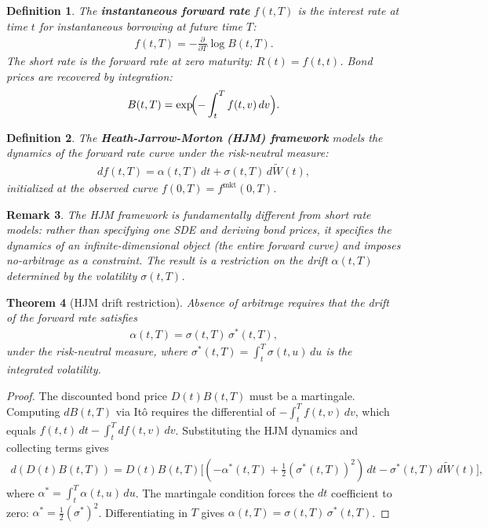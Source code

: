 \documentclass{report}
\theoremstyle{spacedplain}
\newtheorem{theorem}{Theorem}[section]
\theoremstyle{spaceddefinition}
\newtheorem{definition}[theorem]{Definition}
\theoremstyle{spacedremark}
\newtheorem{remark}[theorem]{Remark}
\begin{document}
\begin{definition}
The \textbf{instantaneous forward rate} $f(t,T)$ is the interest rate at time $t$ for instantaneous borrowing at future time $T$:
\begin{align}
    f(t,T) = -\frac{\partial}{\partial T}\log B(t,T).
\end{align}
The short rate is the forward rate at zero maturity: $R(t) = f(t,t)$. Bond prices are recovered by integration:
\begin{align}
    B(t,T) = \exp\!\Bigl(-\int_t^T f(t,v)\,dv\Bigr).
\end{align}
\end{definition}

\begin{definition}
The \textbf{Heath-Jarrow-Morton (HJM) framework} models the dynamics of the forward rate curve under the risk-neutral measure:
\begin{align}
    df(t,T) = \alpha(t,T)\,dt + \sigma(t,T)\,d\widetilde{W}(t),
\end{align}
initialized at the observed curve $f(0,T) = f^{\text{mkt}}(0,T)$.
\end{definition}

\begin{remark}
The HJM framework is fundamentally different from short rate models: rather than specifying one SDE and deriving bond prices, it specifies the dynamics of an infinite-dimensional object (the entire forward curve) and imposes no-arbitrage as a constraint. The result is a restriction on the drift $\alpha(t,T)$ determined by the volatility $\sigma(t,T)$.
\end{remark}

\begin{theorem}[HJM drift restriction]
Absence of arbitrage requires that the drift of the forward rate satisfies
\begin{align}
    \alpha(t,T) = \sigma(t,T)\,\sigma^*(t,T),
\end{align}
under the risk-neutral measure, where $\sigma^*(t,T) = \int_t^T \sigma(t,u)\,du$ is the integrated volatility.
\end{theorem}

\begin{proof}
The discounted bond price $D(t)B(t,T)$ must be a martingale. Computing $dB(t,T)$ via It\^o requires the differential of $-\int_t^T f(t,v)\,dv$, which equals $f(t,t)\,dt - \int_t^T df(t,v)\,dv$. Substituting the HJM dynamics and collecting terms gives
\begin{align}
    d(D(t)B(t,T)) = D(t)B(t,T)\bigl[(-\alpha^*(t,T) + \tfrac{1}{2}(\sigma^*(t,T))^2)\,dt - \sigma^*(t,T)\,d\widetilde{W}(t)\bigr],
\end{align}
where $\alpha^* = \int_t^T \alpha(t,u)\,du$. The martingale condition forces the $dt$ coefficient to zero: $\alpha^* = \frac{1}{2}(\sigma^*)^2$. Differentiating in $T$ gives $\alpha(t,T) = \sigma(t,T)\,\sigma^*(t,T)$.
\end{proof}
\end{document}
